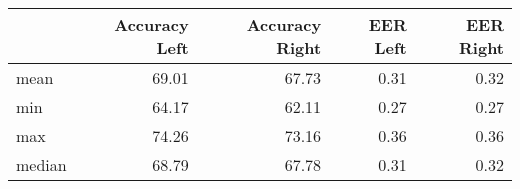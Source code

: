 \begin{tabular}{lrrrr}
\toprule
{} &  Accuracy Left &  Accuracy Right &  EER Left &  EER Right \\
\midrule
mean   &          69.01 &           67.73 &      0.31 &       0.32 \\
min    &          64.17 &           62.11 &      0.27 &       0.27 \\
max    &          74.26 &           73.16 &      0.36 &       0.36 \\
median &          68.79 &           67.78 &      0.31 &       0.32 \\
\bottomrule
\end{tabular}
